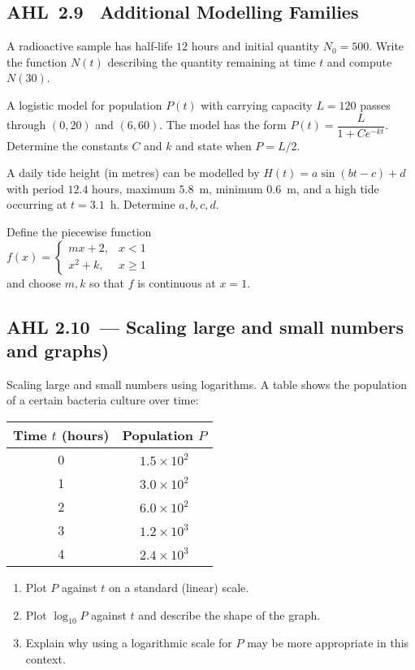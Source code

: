 \documentclass[11pt]{article}
\def\textbf#1{#1}%
\newcommand{\tocsubsection}[1]{\subsection{#1}}
\newcounter{question}
\begin{document}
\tocsubsection{AHL 2.9 \; Additional Modelling Families}

\begin{question}
A radioactive sample has half-life $12$ hours and initial quantity $N_0=500$.
Write the function $N(t)$ describing the quantity remaining at time $t$ and
compute $N(30)$.
\end{question}

\begin{question}
A logistic model for population $P(t)$ with carrying capacity $L=120$ passes
through $(0,20)$ and $(6,60)$.  The model has the form $P(t)=\dfrac{L}{1+Ce^{-kt}}$.
Determine the constants $C$ and $k$ and state when $P=L/2$.
\end{question}

\begin{question}
A daily tide height (in metres) can be modelled by $H(t)=a\sin(bt-c)+d$ with
period $12.4$ hours, maximum $5.8$ m, minimum $0.6$ m, and a high tide
occurring at $t=3.1$ h.  Determine $a,b,c,d$.
\end{question}

\begin{question}
Define the piecewise function
\\[0.5em]
\(f(x)=\begin{cases}mx+2,&x<1\\ x^2+k,&x\ge1\end{cases}\)
\\[0.5em]
and choose $m,k$ so that $f$ is continuous at $x=1$.
\end{question}


\tocsubsection{AHL 2.10 — Scaling large and small numbers and graphs)}


\begin{question}
\textbf{Scaling large and small numbers using logarithms.}
A table shows the population of a certain bacteria culture over time:

\begin{center}
\begin{tabular}{c|c}
Time $t$ (hours) & Population $P$ \\
\hline
0 & $1.5\times 10^{2}$ \\
1 & $3.0\times 10^{2}$ \\
2 & $6.0\times 10^{2}$ \\
3 & $1.2\times 10^{3}$ \\
4 & $2.4\times 10^{3}$
\end{tabular}
\end{center}

\begin{enumerate}
    \item Plot $P$ against $t$ on a standard (linear) scale.
    \item Plot $\log_{10}P$ against $t$ and describe the shape of the graph.
    \item Explain why using a logarithmic scale for $P$ may be more appropriate in this context.
\end{enumerate}
\end{question}
\end{document}
